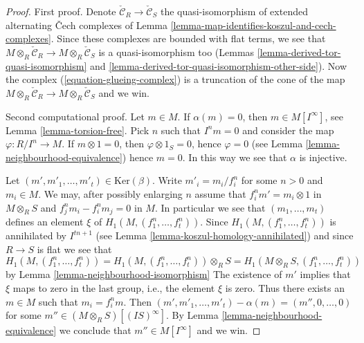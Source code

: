 \begin{proof}
First proof. Denote $\check{\mathcal{C}}_R \to \check{\mathcal{C}}_S$
the quasi-isomorphism of extended alternating {\v C}ech complexes of
Lemma \ref{lemma-map-identifies-koszul-and-cech-complexes}.
Since these complexes are bounded with flat terms, we see that
$M \otimes_R \check{\mathcal{C}}_R \to M \otimes_R \check{\mathcal{C}}_S$
is a quasi-isomorphism too (Lemmas
\ref{lemma-derived-tor-quasi-isomorphism} and
\ref{lemma-derived-tor-quasi-isomorphism-other-side}). Now the complex
(\ref{equation-glueing-complex}) is a truncation of the cone
of the map
$M \otimes_R \check{\mathcal{C}}_R \to M \otimes_R \check{\mathcal{C}}_S$
and we win.

\medskip\noindent
Second computational proof.
Let $m \in M$. If $\alpha(m) = 0$, then $m \in M[I^\infty]$, see
Lemma \ref{lemma-torsion-free}. Pick $n$ such that $I^n m = 0$
and consider the map $\varphi : R/I^n \to M$.
If $m \otimes 1 = 0$, then $\varphi \otimes 1_S = 0$, hence
$\varphi = 0$ (see
Lemma \ref{lemma-neighbourhood-equivalence})
hence $m = 0$. In this way we see that $\alpha$ is injective.

\medskip\noindent
Let $(m', m'_1, \ldots, m'_t) \in \text{Ker}(\beta)$.
Write $m'_i = m_i/f_i^n$ for some $n > 0$ and $m_i \in M$.
We may, after possibly enlarging $n$ assume that
$f_i^n m' = m_i \otimes 1$ in $M \otimes_R S$ and
$f_j^nm_i - f_i^nm_j = 0$ in $M$.
In particular we see that
$(m_1, \ldots, m_t)$ defines an element $\xi$ of
$H_1(M, (f_1^n, \ldots, f_t^n))$.
Since $H_1(M, (f_1^n, \ldots, f_t^n))$ is annihilated by $I^{tn + 1}$ (see
Lemma \ref{lemma-koszul-homology-annihilated})
and since $R \to S$ is flat we see that
$$
H_1(M, (f_1^n, \ldots, f_t^n)) =
H_1(M, (f_1^n, \ldots, f_t^n)) \otimes_R S =
H_1(M \otimes_R S, (f_1^n, \ldots, f_t^n))
$$
by
Lemma \ref{lemma-neighbourhood-isomorphism}
The existence of $m'$ implies that $\xi$ maps to zero in the last group, i.e.,
the element $\xi$ is zero. Thus there exists an $m \in M$ such that
$m_i = f_i^n m$. Then $(m', m'_1, \ldots, m'_t) - \alpha(m)
= (m'', 0, \ldots, 0)$ for some $m'' \in (M \otimes_R S)[(IS)^\infty]$.
By
Lemma \ref{lemma-neighbourhood-equivalence}
we conclude that $m'' \in M[I^\infty]$ and we win.
\end{proof}

